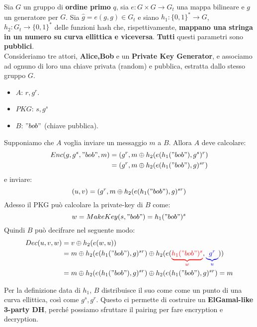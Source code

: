 \begin{definition}\label{def:ibe}
Sia $G$ un gruppo di \textbf{ordine primo} $q$, sia $e:G\times G\longrightarrow G_t$ una mappa bilineare e $g$ un generatore per $G$. Sia $\hat{g}=e(g,g)\in G_t$ e siano $h_1:\{0,1\}^*\longrightarrow G$, $h_2:G_t\longrightarrow\{0,1\}^*$ delle funzioni hash che, rispettivamente, \textbf{mappano una stringa in un numero su curva ellittica e viceversa}. \textbf{Tutti} questi parametri sono \textbf{pubblici}.\\
Consideriamo tre attori, \textbf{Alice,Bob} e un \textbf{Private Key Generator}, e associamo ad ognuno di loro una chiave privata (random) e pubblica, estratta dallo stesso gruppo $G$.
\begin{itemize}
    \item $A$: $r,g^r$.
    \item $PKG$: $s,g^s$
    \item $B$: $"bob"$ (chiave pubblica).
\end{itemize}
Supponiamo che $A$ voglia inviare un messaggio $m$ a $B$. Allora $A$ deve calcolare:
\begin{equation}\label{eq:ibeenc}
    \begin{aligned}
    Enc(g,g^s,"bob",m)&=(g^r,m\oplus h_2(e(h_1("bob"),g^s)^r)\\
    &=(g^r,m\oplus h_2(e(h_1("bob"),g)^{sr})
    \end{aligned}
\end{equation}
e inviare: 
\[(u,v)=(g^r,m\oplus h_2(e(h_1("bob"),g)^{sr})\]
Adesso il PKG può calcolare la private-key di $B$ come: 
\begin{equation}\label{eq:makekey}
w=MakeKey(s,"bob")=h_1("bob")^s    
\end{equation}
Quindi $B$ può decifrare nel seguente modo:
\begin{equation}\label{eq:ibedec}
    \begin{aligned}
    Dec(u,v,w)&=v\oplus h_2(e(w,u))\\
    &=m\oplus h_2(e(h_1("bob"),g)^{sr})\oplus h_2(e(\textcolor{red}{\underbrace{h_1("bob")^s}_{w}},\textcolor{blue}{\underbrace{g^r}_{u}}))\\
    &=m\oplus h_2(e(h_1("bob"),g)^{sr})\oplus h_2(e(h_1("bob"),g)^{sr})=m
    \end{aligned}
\end{equation}
\end{definition}
\begin{remark}
Per la definizione data di $h_1$, $B$ distribuisce il suo come come un punto di una curva ellittica, così come $g^s,g^r$. Questo ci permette di costruire un \textbf{ElGamal-like 3-party DH}, perché possiamo sfruttare il pairing per fare encryption e decryption. 
\end{remark}
